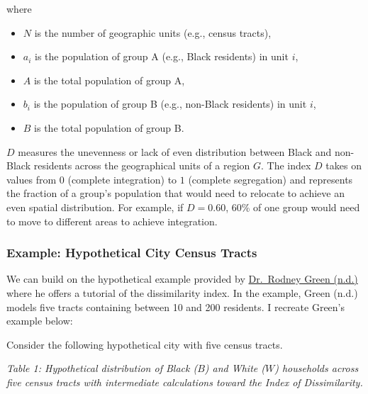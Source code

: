 \documentclass[
  letterpaper,
  DIV=11,
  numbers=noendperiod]{scrartcl}
\providecommand{\tightlist}{%
  \setlength{\itemsep}{0pt}\setlength{\parskip}{0pt}}\usepackage{longtable,booktabs,array}
\begin{document}
where

\begin{itemize}
\tightlist
\item
  \(N\) is the number of geographic units (e.g., census tracts),
\item
  \(a_i\) is the population of group A (e.g., Black residents) in unit
  \(i\),
\item
  \(A\) is the total population of group A,
\item
  \(b_i\) is the population of group B (e.g., non-Black residents) in
  unit \(i\),
\item
  \(B\) is the total population of group B.
\end{itemize}

\(D\) measures the unevenness or lack of even distribution between Black
and non-Black residents across the geographical units of a region \(G\).
The index \(D\) takes on values from \(0\) (complete integration) to
\(1\) (complete segregation) and represents the fraction of a group's
population that would need to relocate to achieve an even spatial
distribution. For example, if \(D = 0.60\), 60\% of one group would need
to move to different areas to achieve integration.

\subsubsection{Example: Hypothetical City Census
Tracts}\label{example-hypothetical-city-census-tracts}

We can build on the hypothetical example provided by
\href{https://coascenters.howard.edu/dissimilarity-index-tutorial}{Dr.~Rodney
Green (n.d.)} where he offers a tutorial of the dissimilarity index. In
the example, Green (n.d.) models five tracts containing between 10 and
200 residents. I recreate Green's example below:

Consider the following hypothetical city with five census tracts.

\emph{Table 1: Hypothetical distribution of Black (\(B\)) and White
(\(W\)) households across five census tracts with intermediate
calculations toward the Index of Dissimilarity.}
\end{document}
